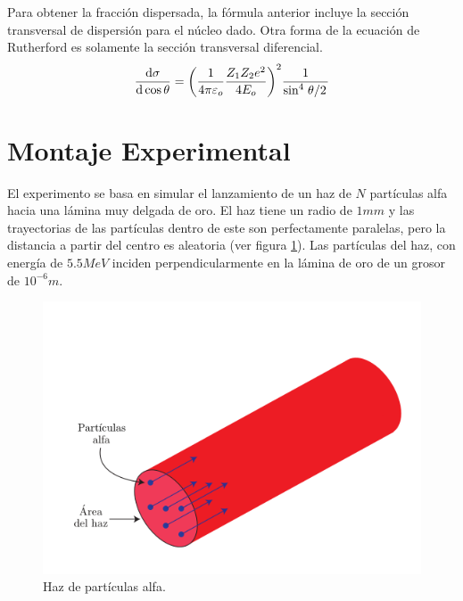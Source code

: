\documentclass[conference]{IEEEtran}
\begin{document}
Para obtener la fracción dispersada, la fórmula anterior incluye la sección transversal de dispersión para el núcleo dado. Otra forma de la ecuación de Rutherford es solamente la sección transversal diferencial.
\begin{equation}
	\dv{\sigma}{\cos{\theta}} = \qty(\frac{1}{4\pi \varepsilon _o} \frac{Z_1 Z_2 e^2}{4E_o})^2 \frac{1}{\sin ^4 {\flatfrac{\theta}{2}}}
\end{equation}




\section{Montaje Experimental}
%

El experimento se basa en simular el lanzamiento de un haz de $N$ partículas alfa hacia una lámina muy delgada de oro. El haz tiene un radio de $1mm$ y las trayectorias de las partículas dentro de este son perfectamente paralelas, pero la distancia a partir del centro es aleatoria (ver figura \ref{haz}). Las partículas del haz, con energía de $5.5 MeV$ inciden perpendicularmente en la lámina de oro de un grosor de $10^{-6} m$. 

\begin{figure}[H]
	\centering
	\includegraphics[scale=0.35]{Imagenes/haz.png}
	\caption{Haz de partículas alfa.}
	\label{haz}
\end{figure}
\end{document}
